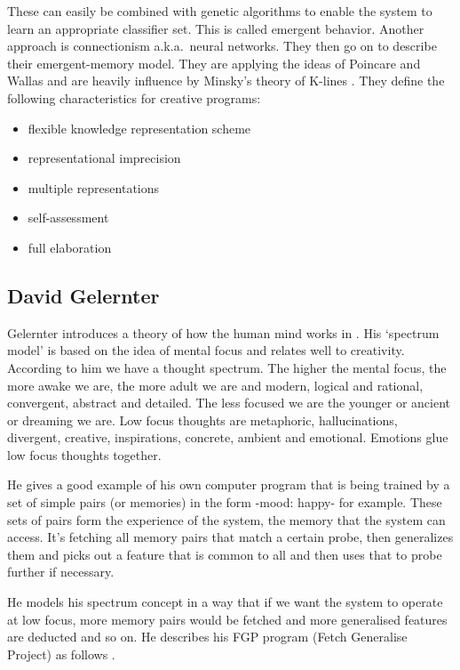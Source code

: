 These can easily be combined with genetic algorithms to enable the system to learn an appropriate classifier set. This is called emergent behavior. Another approach is connectionism a.k.a.\ neural networks. They then go on to describe their emergent-memory model. They are applying the ideas of Poincare and Wallas and are heavily influence by Minsky's theory of K-lines \autocite{Minsky1980, Minsky1988}. They define the following characteristics for creative programs:

\begin{itemize}
  \item flexible knowledge representation scheme
  \item representational imprecision
  \item multiple representations
  \item self-assessment
  \item full elaboration
\end{itemize}


\subsection*{David Gelernter}

Gelernter introduces a theory of how the human mind works in \autocite{Gelernter1994}. His `spectrum model' is based on the idea of mental focus and relates well to creativity. According to him we have a thought spectrum. The higher the mental focus, the more awake we are, the more adult we are and modern, logical and rational, convergent, abstract and detailed. The less focused we are the younger or ancient or dreaming we are. Low focus thoughts are metaphoric, hallucinations, divergent, creative, inspirations, concrete, ambient and emotional. Emotions glue low focus thoughts together.

He gives a good example of his own computer program that is being trained by a set of simple pairs (or memories) in the form -mood: happy- for example. These sets of pairs form the experience of the system, the memory that the system can access. It's fetching all memory pairs that match a certain probe, then generalizes them and picks out a feature that is common to all and then uses that to probe further if necessary.

He models his spectrum concept in a way that if we want the system to operate at low focus, more memory pairs would be fetched and more generalised features are deducted and so on. He describes his FGP program (Fetch Generalise Project) as follows \autocite[p.132]{Gelernter1994}.

